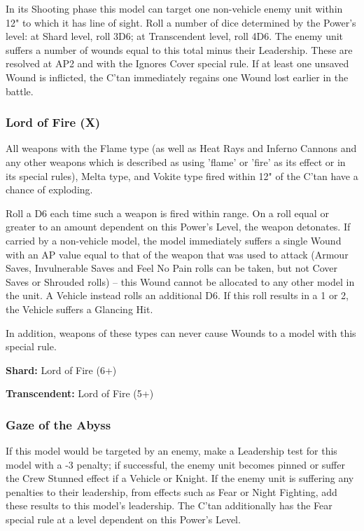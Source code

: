 In its Shooting phase this model can target one non-vehicle enemy unit within 12" to which it has line of sight. Roll a number of dice determined by the Power's level: at Shard level, roll 3D6; at Transcendent level, roll 4D6. The enemy unit suffers a number of wounds equal to this total minus their Leadership. These are resolved at AP2 and with the Ignores Cover special rule. If at least one unsaved Wound is inflicted, the C’tan immediately regains one Wound lost earlier in the battle.

\subsubsection{Lord of Fire (X)} \label{Lord of Fire}

All weapons with the Flame type (as well as Heat Rays and Inferno Cannons and any other weapons which is described as using 'flame' or 'fire' as its effect or in its special rules), Melta type, and Vokite type fired within 12" of the C'tan have a chance of exploding. 

Roll a D6 each time such a weapon is fired within range. On a roll equal or greater to an amount dependent on this Power's Level, the weapon detonates. If carried by a non-vehicle model, the model immediately suffers a single Wound with an AP value equal to that of the weapon that was used to attack (Armour Saves, Invulnerable Saves and Feel No Pain rolls can be taken, but not Cover Saves or Shrouded rolls) – this Wound cannot be allocated to any other model in the unit. A Vehicle instead rolls an additional D6. If this roll results in a 1 or 2, the Vehicle suffers a Glancing Hit.

In addition, weapons of these types can never cause Wounds to a model with this special rule.

\textbf{Shard:} Lord of Fire (6+)

\textbf{Transcendent:} Lord of Fire (5+)


\subsubsection{Gaze of the Abyss} \label{Gaze of the Abyss}

If this model would be targeted by an enemy, make a Leadership test for this model with a -3 penalty; if successful, the enemy unit becomes pinned or suffer the Crew Stunned effect if a Vehicle or Knight. If the enemy unit is suffering any penalties to their leadership, from effects such as Fear or Night Fighting, add these results to this model's leadership. The C'tan additionally has the Fear special rule at a level dependent on this Power's Level.

